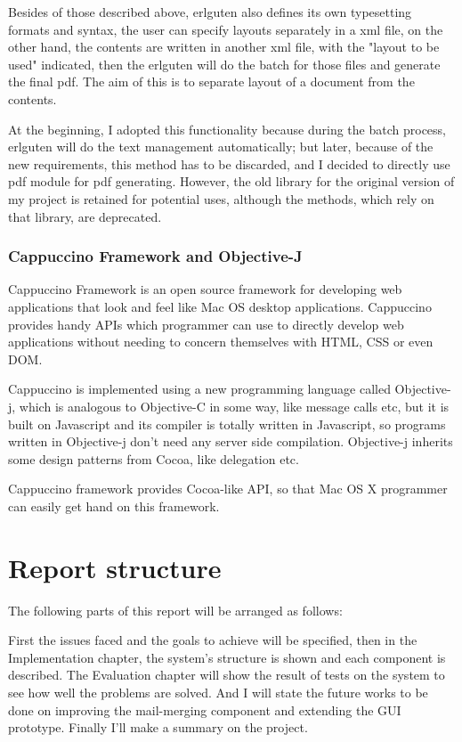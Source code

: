 \documentclass[12pt,twoside,a4paper]{report}
\begin{document}
  Besides of those described above, erlguten also defines its own typesetting formats and syntax, the user can specify layouts separately in a xml file, on the other hand, the contents are written in another xml file, with the "layout to be used" indicated, then the erlguten will do the batch for those files and generate the final pdf. The aim of this is to separate layout of a document from the contents.

  At the beginning, I adopted this functionality because during the batch process, erlguten will do the text management automatically; but later, because of the new requirements, this method has to be discarded, and I decided to directly use pdf module for pdf generating. However, the old library for the original version of my project is retained for potential uses, although the methods, which rely on that library, are deprecated. 

\subsubsection{Cappuccino Framework and Objective-J}
  Cappuccino Framework\cite{capp} is an open source framework for developing web applications that look and feel like Mac OS desktop applications. Cappuccino provides handy APIs which programmer can use to directly develop web applications without needing to concern themselves with HTML, CSS or even DOM. 

  Cappuccino is implemented using a new programming language called Objective-j, which is analogous to Objective-C in some way, like message calls etc, but it is built on Javascript and its compiler is totally written in Javascript, so programs written in Objective-j don't need any server side compilation. Objective-j inherits some design patterns from Cocoa, like delegation etc.

  Cappuccino framework provides Cocoa-like API, so that Mac OS X programmer can easily get hand on this framework.  

\section{Report structure}
  The following parts of this report will be arranged as follows:

  First the issues faced and the goals to achieve will be specified, then in the Implementation chapter, the system's structure is shown and each component is described. The Evaluation chapter will show the result of tests on the system to see how well the problems are solved. And I will state the future works to be done on improving the mail-merging component and extending the GUI prototype. Finally I'll make a summary on the project.
\end{document}
